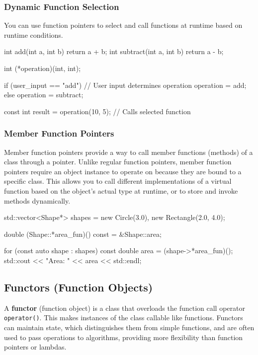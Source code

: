 \subsubsection{Dynamic Function Selection}

You can use function pointers to select and call functions at runtime based on runtime conditions.

\begin{codeblock}[language=C++, numbers=none]
int add(int a, int b) { return a + b; }
int subtract(int a, int b) { return a - b; }

int (*operation)(int, int);

if (user_input == "add") { // User input determines operation
    operation = add;
} else {
    operation = subtract;
}

const int result = operation(10, 5); // Calls selected function
\end{codeblock}

\subsubsection{Member Function Pointers}

Member function pointers provide a way to call member functions (methods) of a class through a pointer. Unlike regular function pointers, member function pointers require an object instance to operate on because they are bound to a specific class. This allows you to call different implementations of a virtual function based on the object's actual type at runtime, or to store and invoke methods dynamically.

\begin{codeblock}[language=C++, numbers=none]
std::vector<Shape*> shapes = {new Circle(3.0), new Rectangle(2.0, 4.0)};

double (Shape::*area_fun)() const = &Shape::area;

for (const auto shape : shapes) {
    const double area = (shape->*area_fun)();
    std::cout << "Area: " << area << std::endl;
}
\end{codeblock}

\subsection{Functors (Function Objects)}

A \textbf{functor} (function object) is a class that overloads the function call operator \texttt{operator()}. This makes instances of the class callable like functions. Functors can maintain state, which distinguishes them from simple functions, and are often used to pass operations to algorithms, providing more flexibility than function pointers or lambdas.

